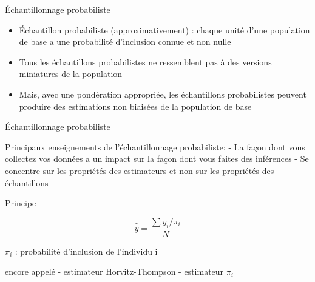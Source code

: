 \documentclass[
  ignorenonframetext,
]{beamer}
\begin{document}
\begin{frame}{Échantillonnage probabiliste}
\protect\hypertarget{uxe9chantillonnage-probabiliste}{}

\begin{itemize}
\item
  Échantillon probabiliste (approximativement) : chaque unité d'une
  population de base a une probabilité d'inclusion connue et non nulle
\item
  Tous les échantillons probabilistes ne ressemblent pas à des versions
  miniatures de la population
\item
  Mais, avec une pondération appropriée, les échantillons probabilistes
  peuvent produire des estimations non biaisées de la population de base
\end{itemize}

\end{frame}

\begin{frame}{Échantillonnage probabiliste}
\protect\hypertarget{uxe9chantillonnage-probabiliste-1}{}

Principaux enseignements de l'échantillonnage probabiliste: - La façon
dont vous collectez vos données a un impact sur la façon dont vous
faites des inférences - Se concentre sur les propriétés des estimateurs
et non sur les propriétés des échantillons

\end{frame}

\begin{frame}{Principe}
\protect\hypertarget{principe}{}

\[ \hat{\bar y} = \frac{\sum y_i/\pi_i}{N} \]

\(\pi_i\) : probabilité d'inclusion de l'individu i

encore appelé - estimateur Horvitz-Thompson - estimateur \(\pi_i\)

\end{frame}
\end{document}
